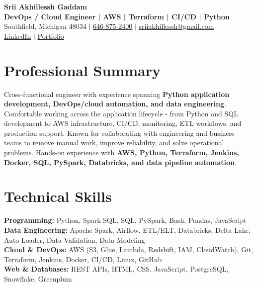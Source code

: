 \documentclass[letterpaper,10pt]{article}
\begin{document}
\fontsize{9.35pt}{10.45pt}\selectfont

\begin{center}
    {\LARGE \textbf{Srii Akhillessh Gaddam}} \\[-1pt]
    \textbf{DevOps / Cloud Engineer | AWS | Terraform | CI/CD | Python} \\[2pt]
    Southfield, Michigan 48034 $|$
    \href{tel:6468752400}{646-875-2400} $|$
    \href{mailto:sriiakhillessh@gmail.com}{sriiakhillessh@gmail.com} \\[1pt]
    \href{https://www.linkedin.com/in/srii-akhiilessh-gaddam-b48668191/}{LinkedIn} $|$
    \href{https://sriiakhillesshg.github.io/portfolio/}{Portfolio}
\end{center}
\vspace{-8pt}

\section{Professional Summary}
\small{Cross-functional engineer with experience spanning \textbf{Python application development, DevOps/cloud automation, and data engineering}. Comfortable working across the application lifecycle - from Python and SQL development to AWS infrastructure, CI/CD, monitoring, ETL workflows, and production support. Known for collaborating with engineering and business teams to remove manual work, improve reliability, and solve operational problems. Hands-on experience with \textbf{AWS, Python, Terraform, Jenkins, Docker, SQL, PySpark, Databricks, and data pipeline automation}.}

\section{Technical Skills}
\small{
\textbf{Programming:} Python, Spark SQL, SQL, PySpark, Bash, Pandas, JavaScript \\
\textbf{Data Engineering:} Apache Spark, Airflow, ETL/ELT, Databricks, Delta Lake, Auto Loader, Data Validation, Data Modeling \\
\textbf{Cloud \& DevOps:} AWS (S3, Glue, Lambda, Redshift, IAM, CloudWatch), Git, Terraform, Jenkins, Docker, CI/CD, Linux, GitHub \\
\textbf{Web \& Databases:} REST APIs, HTML, CSS, JavaScript, PostgreSQL, Snowflake, Greenplum
}
\end{document}
